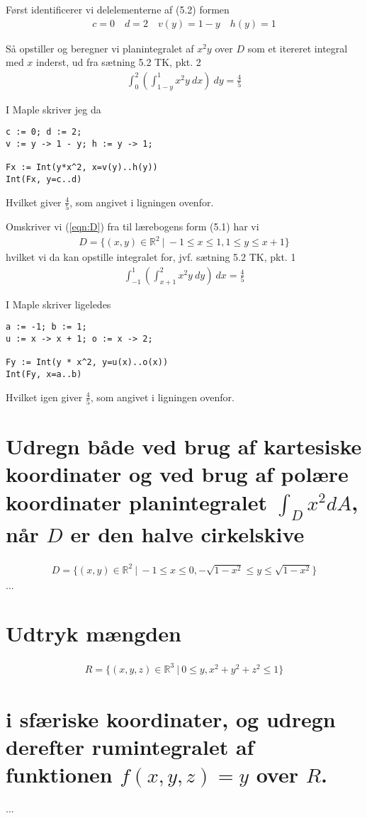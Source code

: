 \documentclass[11pt,a4paper]{article}
\newcommand{\with}[1]{{\ }d#1}
\newcommand{\Int}[4]{\int_{#1}^{#2}#3\with{#4}}
\begin{document}
\begin{multicols}{2}
Først identificerer vi delelementerne af (5.2) formen
\begin{align}
    c = 0 \quad
    d = 2 \quad
    v(y) = 1 - y \quad
    h(y) = 1
\end{align}

Så opstiller og beregner vi planintegralet af $x^2 y$ over $D$ som et
itereret integral med $x$ inderst, ud fra sætning 5.2 TK, pkt. 2
\begin{align}
    \Int{0}{2}{ \left( \Int{1-y}{1}{x^2 y}{x} \right) }{y}
    =
    \frac{4}{5}
\end{align}

I Maple skriver jeg da
\begin{lstlisting}
c := 0; d := 2;
v := y -> 1 - y; h := y -> 1;

Fx := Int(y*x^2, x=v(y)..h(y))
Int(Fx, y=c..d)
\end{lstlisting}
Hvilket giver $\frac{4}{5}$, som angivet i ligningen ovenfor.

Omskriver vi (\ref{eqn:D}) fra til lærebogens form (5.1) har vi
\begin{align}
    D = \{ (x,y) \in \mathbb{R}^2{\ }|{\ }-1 \leq x \leq 1, 1 \leq y \leq x + 1 \}
\end{align}
hvilket vi da kan opstille integralet for, jvf. sætning 5.2 TK, pkt. 1
\begin{align}
    \Int{-1}{1}{ \left( \Int{x+1}{2}{x^2 y}{y} \right) }{x}
    = \frac{4}{5}
\end{align}

I Maple skriver ligeledes
\begin{lstlisting}
a := -1; b := 1;
u := x -> x + 1; o := x -> 2;

Fy := Int(y * x^2, y=u(x)..o(x))
Int(Fy, x=a..b)
\end{lstlisting}
Hvilket igen giver $\frac{4}{5}$, som angivet i ligningen ovenfor.

\end{multicols}

\newpage
\section
{
    \mdseries
    Udregn både ved brug af kartesiske koordinater og ved brug af polære
    koordinater planintegralet $\int_D x^2 d A$, når $D$ er den halve
    cirkelskive
}
\begin{align}
    D = \{ (x,y) \in \mathbb{R}^2{\ }|{\ }
        -1 \leq x \leq 0,
    -\sqrt{1 - x^2} \leq y \leq \sqrt{1 - x^2} \}
\end{align}
...


\section
{
    \mdseries
    Udtryk mængden
}
\begin{align}
    R = \{ (x,y,z) \in \mathbb{R}^3{\ }|{\ }0 \leq y, x^2 + y^2 + z^2 \leq 1 \}
\end{align}
\section*
{
    \mdseries
    i sfæriske koordinater, og udregn derefter rumintegralet af funktionen
    $f(x,y,z) = y$ over $R$.
}
...
\end{document}
